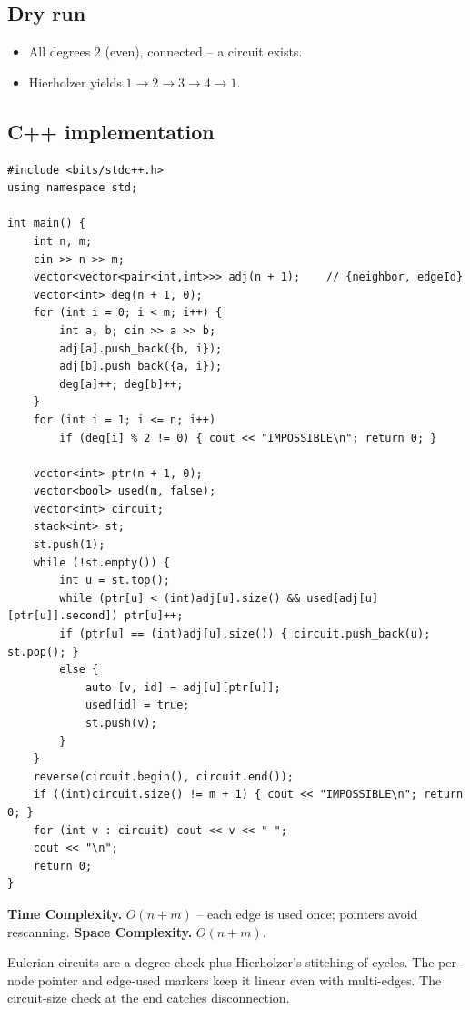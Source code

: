 \subsection*{Dry run}


\begin{itemize}
  \item All degrees $2$ (even), connected -- a circuit exists.
  \item Hierholzer yields $1\to2\to3\to4\to1$.
\end{itemize}

\subsection*{C++ implementation}

\begin{lstlisting}
#include <bits/stdc++.h>
using namespace std;

int main() {
    int n, m;
    cin >> n >> m;
    vector<vector<pair<int,int>>> adj(n + 1);    // {neighbor, edgeId}
    vector<int> deg(n + 1, 0);
    for (int i = 0; i < m; i++) {
        int a, b; cin >> a >> b;
        adj[a].push_back({b, i});
        adj[b].push_back({a, i});
        deg[a]++; deg[b]++;
    }
    for (int i = 1; i <= n; i++)
        if (deg[i] % 2 != 0) { cout << "IMPOSSIBLE\n"; return 0; }

    vector<int> ptr(n + 1, 0);
    vector<bool> used(m, false);
    vector<int> circuit;
    stack<int> st;
    st.push(1);
    while (!st.empty()) {
        int u = st.top();
        while (ptr[u] < (int)adj[u].size() && used[adj[u][ptr[u]].second]) ptr[u]++;
        if (ptr[u] == (int)adj[u].size()) { circuit.push_back(u); st.pop(); }
        else {
            auto [v, id] = adj[u][ptr[u]];
            used[id] = true;
            st.push(v);
        }
    }
    reverse(circuit.begin(), circuit.end());
    if ((int)circuit.size() != m + 1) { cout << "IMPOSSIBLE\n"; return 0; }
    for (int v : circuit) cout << v << " ";
    cout << "\n";
    return 0;
}
\end{lstlisting}

\begin{complexitybox}
\textbf{Time Complexity.} $O(n+m)$ -- each edge is used once; pointers avoid
rescanning. \textbf{Space Complexity.} $O(n+m)$.
\end{complexitybox}

\begin{takeawaybox}
Eulerian circuits are a degree check plus Hierholzer's stitching of cycles.
The per-node pointer and edge-used markers keep it linear even with
multi-edges. The circuit-size check at the end catches disconnection.
\end{takeawaybox}
